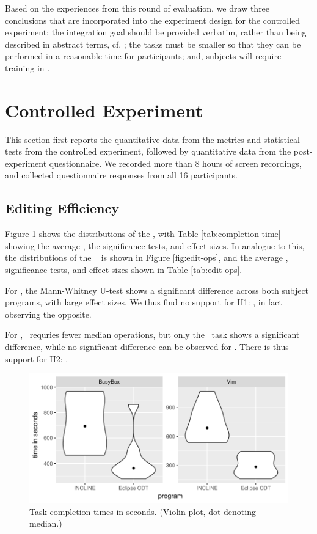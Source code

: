 Based on the experiences from this round of evaluation, we draw three conclusions that are incorporated into the experiment design for the controlled experiment: the integration goal should be provided verbatim, rather than being described in abstract terms, cf. \cite{berger2016mps}; the tasks must be smaller so that they can be performed in a reasonable time for participants; and, subjects will require training in \tooln.


\section{Controlled Experiment}
This section first reports the quantitative data from the metrics and statistical tests from the controlled experiment, followed by quantitative data from the post-experiment questionnaire. We recorded more than 8 hours of screen recordings, and collected questionnaire responses from all 16 participants.

\subsection{Editing Efficiency}
Figure \ref{fig:completion-times} shows the distributions of the \ctimes, with Table \ref{tab:completion-time} showing the average \ctimes, the significance tests, and effect sizes. In analogue to this, the distributions of the \eops~ is shown in Figure \ref{fig:edit-ops}, and the average \eops, significance tests, and effect sizes shown in Table \ref{tab:edit-ops}.

For \ctimes, the Mann-Whitney U-test shows a significant difference across both subject programs, with large effect sizes. We thus find no support for H1: \textit{\HA}, in fact observing the opposite.

For \eops, \tooln~requries fewer median operations, but only the \busybox~task shows a significant difference, while no significant difference can be observed for \vim. There is thus support for H2: \textit{\HB}.

\begin{figure}[ht]
    \centering
    \includegraphics{figure/incl-violin-all.pdf}
    \caption{Task completion times in seconds. (Violin plot, dot denoting median.)}
    \label{fig:completion-times}
\end{figure}

